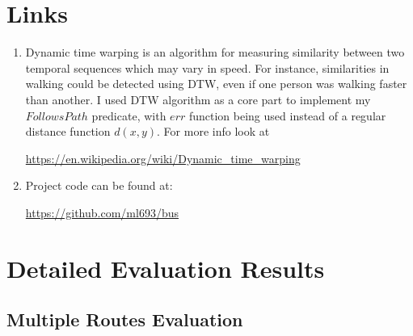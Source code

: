 \documentclass[12pt,a4paper,oneside,openright]{report}
\begin{document}
\chapter{Links}

\begin{enumerate}
\item Dynamic time warping is an algorithm for measuring similarity between
two temporal sequences which may vary in speed. For instance, similarities in
walking could be detected using DTW, even if one person was walking faster than
another. I used DTW algorithm as a core part to implement my $FollowsPath$
predicate, with $err$ function being used instead of a regular distance function 
$d(x, y)$.
For more info look at

\textcolor{blue}{\url{https://en.wikipedia.org/wiki/Dynamic_time_warping}}

\item Project code can be found at: 

\textcolor{blue}{\url{https://github.com/ml693/bus}}


\end{enumerate}

\chapter{Detailed Evaluation Results}

\section{Multiple Routes Evaluation}

\label{B1}
\end{document}
